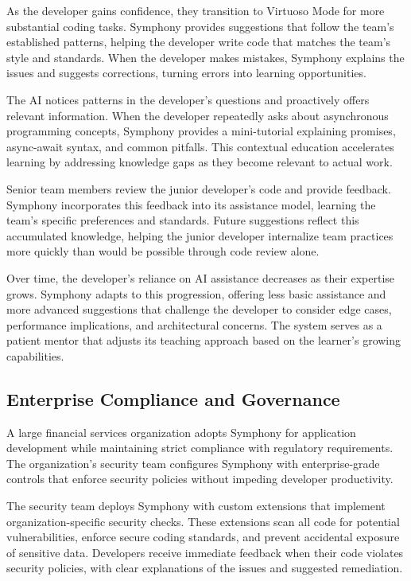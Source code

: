 As the developer gains confidence, they transition to Virtuoso Mode for more substantial coding tasks. Symphony provides suggestions that follow the team's established patterns, helping the developer write code that matches the team's style and standards. When the developer makes mistakes, Symphony explains the issues and suggests corrections, turning errors into learning opportunities.

The AI notices patterns in the developer's questions and proactively offers relevant information. When the developer repeatedly asks about asynchronous programming concepts, Symphony provides a mini-tutorial explaining promises, async-await syntax, and common pitfalls. This contextual education accelerates learning by addressing knowledge gaps as they become relevant to actual work.

Senior team members review the junior developer's code and provide feedback. Symphony incorporates this feedback into its assistance model, learning the team's specific preferences and standards. Future suggestions reflect this accumulated knowledge, helping the junior developer internalize team practices more quickly than would be possible through code review alone.

Over time, the developer's reliance on AI assistance decreases as their expertise grows. Symphony adapts to this progression, offering less basic assistance and more advanced suggestions that challenge the developer to consider edge cases, performance implications, and architectural concerns. The system serves as a patient mentor that adjusts its teaching approach based on the learner's growing capabilities.

\subsection{Enterprise Compliance and Governance}
\label{subsec:enterprise-compliance}

A large financial services organization adopts Symphony for application development while maintaining strict compliance with regulatory requirements. The organization's security team configures Symphony with enterprise-grade controls that enforce security policies without impeding developer productivity.

The security team deploys Symphony with custom extensions that implement organization-specific security checks. These extensions scan all code for potential vulnerabilities, enforce secure coding standards, and prevent accidental exposure of sensitive data. Developers receive immediate feedback when their code violates security policies, with clear explanations of the issues and suggested remediation.

